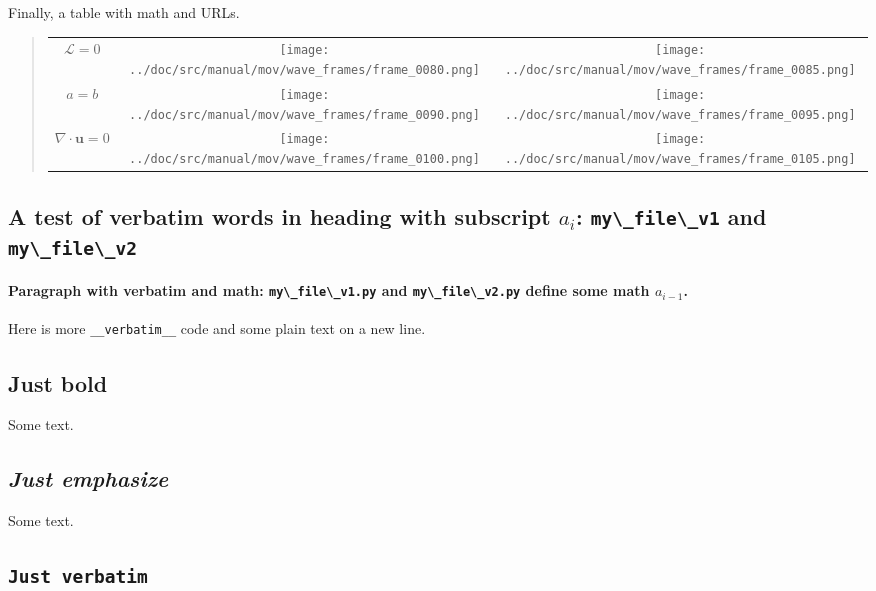\documentclass[%
oneside,                 %
final,                   %
10pt]{article}
\theoremstyle{definition}
\begin{document}
\begin{enumerate}
\noindent
Finally, a table with math
and URLs.



\begin{quote}
\begin{tabular}{ccc}
\hline
 \\
\hline
$\mathcal{L}=0$         & \texttt{[image: ../doc/src/manual/mov/wave\_frames/frame\_0080.png]} & \texttt{[image: ../doc/src/manual/mov/wave\_frames/frame\_0085.png]} \\
$a=b$                   & \texttt{[image: ../doc/src/manual/mov/wave\_frames/frame\_0090.png]} & \texttt{[image: ../doc/src/manual/mov/wave\_frames/frame\_0095.png]} \\
$\nabla\cdot\bm{u} =0 $ & \texttt{[image: ../doc/src/manual/mov/wave\_frames/frame\_0100.png]} & \texttt{[image: ../doc/src/manual/mov/wave\_frames/frame\_0105.png]} \\
\hline
\end{tabular}
\end{quote}

\noindent
\subsection{A test of verbatim words in heading with subscript $a_i$: \protect\Verb!my\_file\_v1! and \protect\Verb!my\_file\_v2! }

\paragraph{Paragraph with verbatim and math: \protect\Verb!my\_file\_v1.py! and \protect\Verb!my\_file\_v2.py! define some math $a_{i-1}$.}
Here is more \Verb!__verbatim__! code and
some plain text on a new line.

\subsection{\textbf{Just bold}}

Some text.

\subsection{\emph{Just emphasize}}

Some text.

\subsection{\texttt{Just verbatim} }


\end{enumerate}
\end{document}
